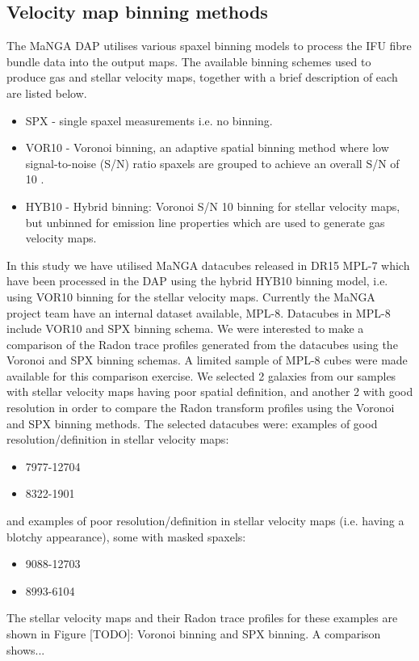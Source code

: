 \subsection{Velocity map binning methods}
The MaNGA DAP utilises various spaxel binning models to process the IFU fibre bundle data into the output maps. The available binning schemes used to produce gas and stellar velocity maps, together with a brief description of each are listed below.

\begin{itemize}
    \item SPX - single spaxel measurements i.e. no binning.
    \item VOR10 - Voronoi binning, an adaptive spatial binning method where low signal-to-noise (S/N) ratio spaxels are grouped to achieve an overall S/N of 10  \citep{2003MNRAS.342..345C, 2019arXiv190100856W}.
    \item HYB10 - Hybrid binning: Voronoi S/N 10 binning for stellar velocity maps, but unbinned for emission line properties which are used to generate gas velocity maps.
\end{itemize}  

In this study we have utilised MaNGA datacubes released in DR15 MPL-7 which have been processed in the DAP using the hybrid HYB10 binning model, i.e. using VOR10 binning for the stellar velocity maps. Currently the MaNGA project team have an internal dataset available, MPL-8. Datacubes in MPL-8 include VOR10 and SPX binning schema. We were interested to make a comparison of the Radon trace profiles generated from the datacubes using the Voronoi and SPX binning schemas. A limited sample of MPL-8 cubes were made available for this comparison exercise. We selected 2 galaxies from our samples with stellar velocity maps having poor spatial definition, and another 2 with good resolution in order to compare the Radon transform profiles using the Voronoi and SPX binning methods. The selected datacubes were: examples of good resolution/definition in stellar velocity maps:

\begin{itemize}
    \item 7977-12704
    \item 8322-1901
\end{itemize}

and examples of poor resolution/definition in stellar velocity maps (i.e. having a blotchy appearance), some with masked spaxels:

\begin{itemize}
    \item 9088-12703
    \item 8993-6104
\end{itemize}

The stellar velocity maps and their Radon trace profiles for these examples are shown in Figure [TODO]: Voronoi binning and SPX binning. A comparison shows...